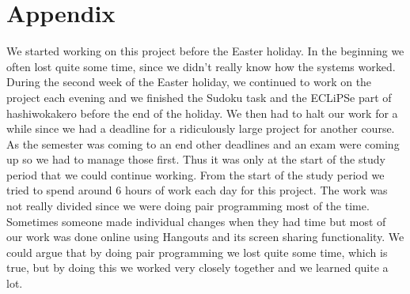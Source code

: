 \documentclass{report}
\newcommand{\mychapter}[2]{
    \setcounter{chapter}{#1}
    \setcounter{section}{0}
    \chapter*{#2}
    \addcontentsline{toc}{chapter}{#2}
}
\begin{document}
\mychapter{4}{Appendix}
We started working on this project before the Easter holiday. In the beginning we often lost quite some time, since we didn't really know how the systems worked. During the second week of the Easter holiday, we continued to work on the project each evening and we finished the Sudoku task and the ECLiPSe part of hashiwokakero before the end of the holiday. We then had to halt our work for a while since we had a deadline for a ridiculously large project for another course. As the semester was coming to an end other deadlines and an exam were coming up so we had to manage those first. Thus it was only at the start of the study period that we could continue working. From the start of the study period we tried to spend around 6 hours of work each day for this project. The work was not really divided since we were doing pair programming most of the time. Sometimes someone made individual changes when they had time but most of our work was done online using Hangouts and its screen sharing functionality. We could argue that by doing pair programming we lost quite some time, which is true, but by doing this we worked very closely together and we learned quite a lot.  
\end{document}
